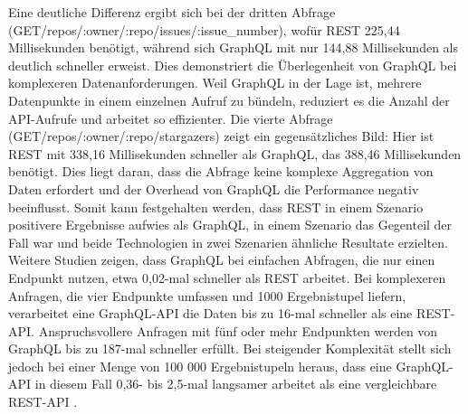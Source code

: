 Eine deutliche Differenz ergibt sich bei der dritten Abfrage (GET/repos/:owner/:repo/issues/:issue\_number), wofür REST 225,44 Millisekunden benötigt, während sich GraphQL mit nur 144,88 Millisekunden als deutlich schneller erweist. Dies demonstriert die Überlegenheit von GraphQL bei komplexeren Datenanforderungen. Weil GraphQL in der Lage ist, mehrere Datenpunkte in einem einzelnen Aufruf zu bündeln, reduziert es die Anzahl der API-Aufrufe und arbeitet so effizienter. Die vierte Abfrage (GET/repos/:owner/:repo/stargazers) zeigt ein gegensätzliches Bild: Hier ist REST mit 338,16 Millisekunden schneller als GraphQL, das 388,46 Millisekunden benötigt. Dies liegt daran, dass die Abfrage keine komplexe Aggregation von Daten erfordert und der Overhead von GraphQL die Performance negativ beeinflusst. Somit kann festgehalten werden, dass REST in einem Szenario positivere Ergebnisse aufwies als GraphQL, in einem Szenario das Gegenteil der Fall war und beide Technologien in zwei Szenarien ähnliche Resultate erzielten. 
\citep{graphqlreplacerest}
\newpage
\noindent
Weitere Studien zeigen, dass GraphQL bei einfachen Abfragen, die nur einen Endpunkt nutzen, etwa 0,02-mal schneller als REST arbeitet.  \citep{migrategraphql}
\newline
Bei komplexeren Anfragen, die vier Endpunkte umfassen und 1000 Ergebnistupel liefern, verarbeitet eine GraphQL-API die Daten bis zu 16-mal schneller als eine REST-API.\citep{analysegraphql}
\newline
Anspruchsvollere Anfragen mit fünf oder mehr Endpunkten werden von GraphQL bis zu 187-mal schneller erfüllt.\citep{analysewebgraphql}
\newline
Bei steigender Komplexität stellt sich jedoch bei einer Menge von 100 000 Ergebnistupeln heraus, dass eine GraphQL-API in diesem Fall 0,36-\citep{analysegraphql} bis 2,5-mal langsamer arbeitet als eine vergleichbare REST-API \citep{restvsgraphql}.
